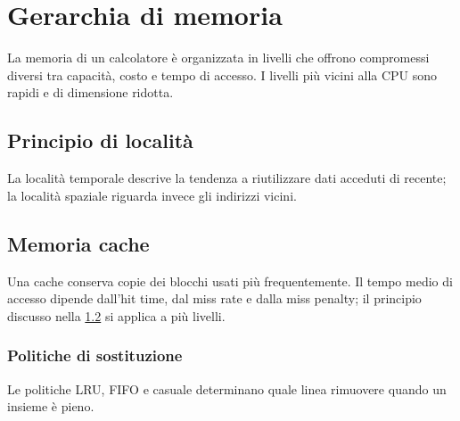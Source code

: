 \documentclass{../../../unipd-notes}
\begin{document}
\chapter{Gerarchia di memoria}

La memoria di un calcolatore è organizzata in livelli che offrono compromessi diversi tra capacità, costo e tempo di accesso. I livelli più vicini alla CPU sono rapidi e di dimensione ridotta.

\section{Principio di località}

La località temporale descrive la tendenza a riutilizzare dati acceduti di recente; la località spaziale riguarda invece gli indirizzi vicini.

\newpage
\section{Memoria cache}\label{sec:header-target}

Una cache conserva copie dei blocchi usati più frequentemente. Il tempo medio di accesso dipende dall'hit time, dal miss rate e dalla miss penalty; il principio discusso nella \cref{sec:header-target} si applica a più livelli.

\subsection{Politiche di sostituzione}

Le politiche LRU, FIFO e casuale determinano quale linea rimuovere quando un insieme è pieno.
\end{document}
